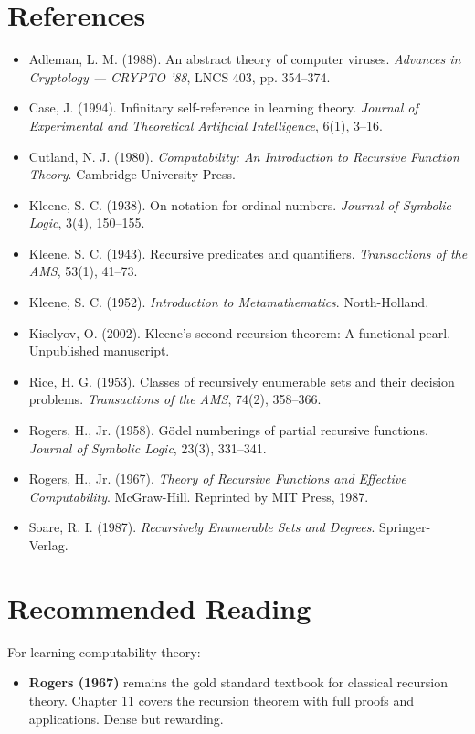 \section{References}

\begin{itemize}
\item Adleman, L. M. (1988). An abstract theory of computer viruses. \textit{Advances in Cryptology --- CRYPTO '88}, LNCS 403, pp. 354--374.
\item Case, J. (1994). Infinitary self-reference in learning theory. \textit{Journal of Experimental and Theoretical Artificial Intelligence}, 6(1), 3--16.
\item Cutland, N. J. (1980). \textit{Computability: An Introduction to Recursive Function Theory}. Cambridge University Press.
\item Kleene, S. C. (1938). On notation for ordinal numbers. \textit{Journal of Symbolic Logic}, 3(4), 150--155.
\item Kleene, S. C. (1943). Recursive predicates and quantifiers. \textit{Transactions of the AMS}, 53(1), 41--73.
\item Kleene, S. C. (1952). \textit{Introduction to Metamathematics}. North-Holland.
\item Kiselyov, O. (2002). Kleene's second recursion theorem: A functional pearl. Unpublished manuscript.
\item Rice, H. G. (1953). Classes of recursively enumerable sets and their decision problems. \textit{Transactions of the AMS}, 74(2), 358--366.
\item Rogers, H., Jr. (1958). Gödel numberings of partial recursive functions. \textit{Journal of Symbolic Logic}, 23(3), 331--341.
\item Rogers, H., Jr. (1967). \textit{Theory of Recursive Functions and Effective Computability}. McGraw-Hill. Reprinted by MIT Press, 1987.
\item Soare, R. I. (1987). \textit{Recursively Enumerable Sets and Degrees}. Springer-Verlag.
\end{itemize}



\section{Recommended Reading}

For learning computability theory:

\begin{itemize}
\item \textbf{Rogers (1967)} remains the gold standard textbook for classical recursion theory. Chapter 11 covers the recursion theorem with full proofs and applications. Dense but rewarding.
\end{itemize}

